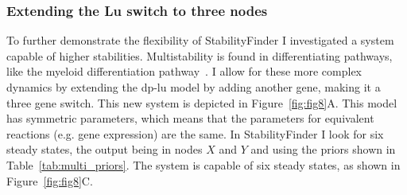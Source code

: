 

\clearpage
\subsubsection{Extending the Lu switch to three nodes}
To further demonstrate the flexibility of StabilityFinder I investigated a system capable of higher stabilities. Multistability is found in differentiating pathways, like the myeloid differentiation pathway~\autocite{Ghaffarizadeh:2014bt, Cinquin:2005go}. I allow for these more complex dynamics by extending the \acrshort{dp-lu} model by adding another gene, making it a three gene switch.  This new system is depicted in Figure~\ref{fig:fig8}A. This model has symmetric parameters, which means that the parameters for equivalent reactions (e.g. gene expression) are the same. In StabilityFinder I look for six steady states, the output being in nodes $X$ and $Y$ and using the priors shown in Table~\ref{tab:multi_priors}. The system is capable of six steady states, as shown in Figure~\ref{fig:fig8}C. 

